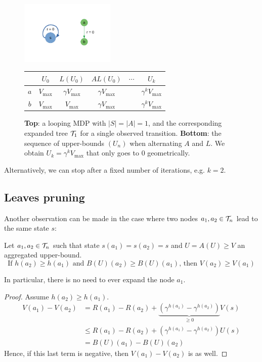 \documentclass{article}
\begin{document}
\begin{figure}
    \centering
    \includegraphics[trim=2cm 2cm 2cm 2cm, clip, width=0.4\textwidth]{img/simple_loop.pdf}\\
    \begin{tabular}{cccccc}
         \toprule
         & $U_0$ & $L (U_0)$ & $AL(U_0)$ & $\cdots$ & $U_k$ \\
         \midrule
         $a$ & $V_{\max}$ & $\gamma V_{\max}$ & $\gamma V_{\max}$ && $\gamma^k V_{\max}$\\
         $b$ & $V_{\max}$ & $V_{\max}$ & $\gamma V_{\max}$ && $\gamma^k V_{\max}$\\
         \bottomrule
    \end{tabular}
    \caption{\textbf{Top}: a looping MDP with $|S|=|A|=1$, and the corresponding expanded tree $\mathcal{T}_1$ for a single observed transition. \textbf{Bottom}: the sequence of upper-bounds $(U_n)$ when alternating $A$ and $L$. We obtain $U_k = \gamma^k V_{\max}$ that only goes to $0$ geometrically.}
    \label{fig:simple_loop}
\end{figure}

Alternatively, we can stop after a fixed number of iterations, e.g. $k=2$.

\subsection{Leaves pruning}
\label{sec:pruning}

Another observation can be made in the case where two nodes $a_1,a_2\in\mathcal{T}_n$ lead to the same state $s$:
\begin{proposition}
\label{prop:pruning}
Let $a_1,a_2\in\mathcal{T}_n$ such that state $s(a_1) = s(a_2) = s$ and $U = A(U) \geq V$ an aggregated upper-bound. 
\begin{equation}
\label{eq:pruning}
    \text{If } h(a_2) \geq h(a_1) \text{ and } B(U)(a_2) \geq B(U)(a_1)
    \text{, then }V(a_2) \geq V(a_1)
\end{equation}

In particular, there is no need to ever expand the node $a_1$.
\end{proposition}
\begin{proof}
Assume $h(a_2) \geq h(a_1)$.
\begin{align*}
    V(a_1) - V(a_2) &= R(a_1)- R(a_2) + \underbrace{\left(\gamma^{h(a_1)} - \gamma^{h(a_2)}\right)}_{\geq 0}V(s) \\
    &\leq R(a_1)- R(a_2) + \left(\gamma^{h(a_1)} - \gamma^{h(a_2)}\right)U(s)\\
    &= B(U)(a_1) - B(U)(a_2)
\end{align*}
Hence, if this last term is negative, then $V(a_1) - V(a_2)$ is as well.
\end{proof}
\end{document}
